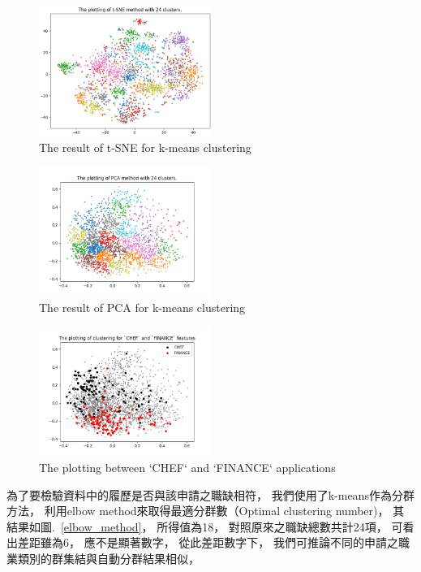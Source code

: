 \documentclass[acmsmall]{acmart}
\begin{document}
\begin{figure}
    \centerline{\includegraphics[width=0.5\textwidth]{t_sne.png}}
    \caption{The result of t-SNE for k-means clustering}
    \label{t_sne}
\end{figure}

\begin{figure}
    \centerline{\includegraphics[width=0.5\textwidth]{pca.png}}
    \caption{The result of PCA for k-means clustering}
    \label{pca}
\end{figure}

\begin{figure}
    \centerline{\includegraphics[width=0.5\textwidth]{chef_finance_plotting.png}}
    \caption{The plotting between `CHEF` and `FINANCE` applications}
    \label{chef_finance_plotting}
\end{figure}


為了要檢驗資料中的履歷是否與該申請之職缺相符，
我們使用了k-means\cite{macqueen1967some}作為分群方法，
利用elbow method來取得最適分群數（Optimal clustering number)，
其結果如圖.~\ref{elbow_method}，
所得值為18，
對照原來之職缺總數共計24項，
可看出差距雖為6，
應不是顯著數字，
從此差距數字下，
我們可推論不同的申請之職業類別的群集結與自動分群結果相似，
\end{document}
